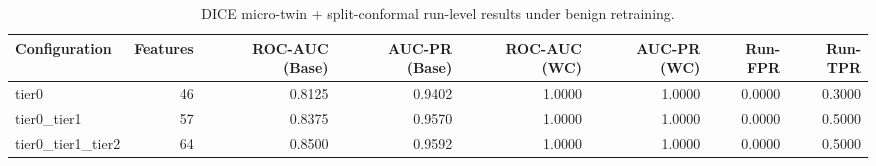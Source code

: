 \begin{table}[t]
\centering
\caption{DICE micro-twin + split-conformal run-level results under benign retraining.}
\label{tab:dice_full_overall}
\footnotesize
\begin{tabular}{lrrrrrrr}
\toprule
Configuration & Features & ROC-AUC (Base) & AUC-PR (Base) & ROC-AUC (WC) & AUC-PR (WC) & Run-FPR & Run-TPR \\
\midrule
tier0 & 46 & 0.8125 & 0.9402 & 1.0000 & 1.0000 & 0.0000 & 0.3000 \\
tier0_tier1 & 57 & 0.8375 & 0.9570 & 1.0000 & 1.0000 & 0.0000 & 0.5000 \\
tier0_tier1_tier2 & 64 & 0.8500 & 0.9592 & 1.0000 & 1.0000 & 0.0000 & 0.5000 \\
\bottomrule
\end{tabular}

\end{table}
